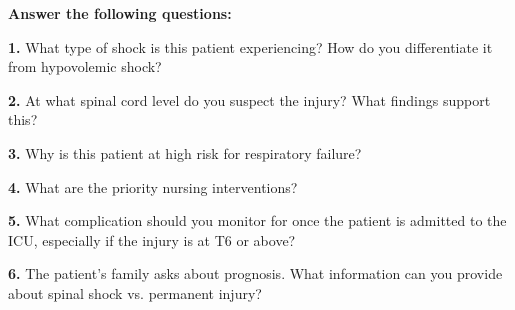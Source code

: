 \documentclass[11pt]{article}
\begin{document}
\vspace{0.5cm}
\textbf{Answer the following questions:}

\textbf{1.} What type of shock is this patient experiencing? How do you differentiate it from hypovolemic shock?

\vspace{1.5cm}

\textbf{2.} At what spinal cord level do you suspect the injury? What findings support this?

\vspace{1.5cm}

\textbf{3.} Why is this patient at high risk for respiratory failure?

\vspace{1.5cm}

\textbf{4.} What are the priority nursing interventions?

\vspace{1.5cm}

\textbf{5.} What complication should you monitor for once the patient is admitted to the ICU, especially if the injury is at T6 or above?

\vspace{1.5cm}

\textbf{6.} The patient's family asks about prognosis. What information can you provide about spinal shock vs. permanent injury?

\vspace{2cm}
\end{document}
